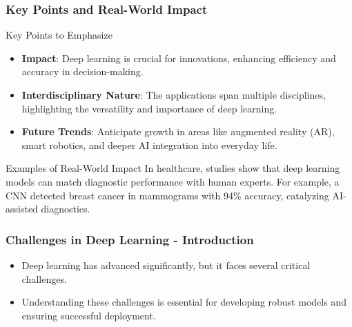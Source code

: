 \documentclass[aspectratio=169]{beamer}
\begin{document}
\begin{frame}[fragile]
    \frametitle{Key Points and Real-World Impact}
    \begin{block}{Key Points to Emphasize}
        \begin{itemize}
            \item \textbf{Impact}: Deep learning is crucial for innovations, enhancing efficiency and accuracy in decision-making.
            \item \textbf{Interdisciplinary Nature}: The applications span multiple disciplines, highlighting the versatility and importance of deep learning.
            \item \textbf{Future Trends}: Anticipate growth in areas like augmented reality (AR), smart robotics, and deeper AI integration into everyday life.
        \end{itemize}
    \end{block}

    \begin{block}{Examples of Real-World Impact}
        In healthcare, studies show that deep learning models can match diagnostic performance with human experts. 
        For example, a CNN detected breast cancer in mammograms with 94\% accuracy, catalyzing AI-assisted diagnostics.
    \end{block}
\end{frame}

\begin{frame}
    \frametitle{Challenges in Deep Learning - Introduction}
    \begin{itemize}
        \item Deep learning has advanced significantly, but it faces several critical challenges.
        \item Understanding these challenges is essential for developing robust models and ensuring successful deployment.
    \end{itemize}
\end{frame}
\end{document}
